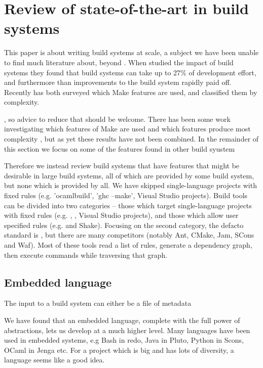 \section{Review of state-of-the-art in build systems\label{section-review}}

This paper is about writing build systems at scale, a subject we have been unable to find much literature about, beyond \citet{miller:recursive_make}. When \citet{mcintosh:build_maintenance_effort} studied the impact of build systems they found that build systems can take up to 27\% of development effort, and furthermore than improvements to the build system rapidly paid off. Recently \citet{martin:make_it_simple, martin:maintenance_complexity_makefiles} has both surveyed which Make features are used, and classified them by complexity.


, so advice to reduce that should be welcome. There has been some work investigating which features of Make are used \cite{martin:make_it_simple} and which features produce most complexity \cite{martin:maintenance_complexity_makefiles}, but as yet these results have not been combined. In the remainder of this section we focus on some of the features found in other build syustem

Therefore we instead review build systems that have features that might be desirable in large build systems, all of which are provided by some build system, but none which is provided by all. We have skipped single-language projects with fixed rules (e.g. \lst'ocamlbuild', \lst'ghc --make', Visual Studio projects). Build tools can be divided into two categories -- those which target single-language projects with fixed rules (e.g. , , Visual Studio projects), and those which allow user specified rules (e.g. \make{} and Shake). Focusing on the second category, the defacto standard is \make{}, but there are many \make{} competitors (notably Ant, CMake, Jam, SCons and Waf). Most of these tools read a list of rules, generate a dependency graph, then execute commands while traversing that graph.

\subsection{Embedded language}

The input to a build system can either be a file of metadata 


We have found that an embedded language, complete with the full power of abstractions, lets us develop at a much higher level. Many languages have been used in embedded systems, e.g Bash in redo, Java in Pluto, Python in Scons, OCaml in Jenga etc. For a project which is big and has lots of diversity, a language seems like a good idea.

